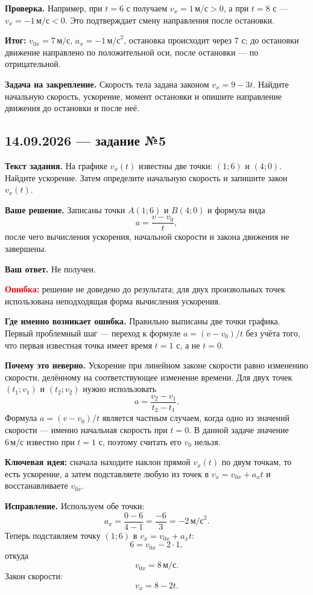 \documentclass[12pt,a4paper]{article}
\newcommand{\taskhead}[1]{\subsection*{#1}}
\newcommand{\field}[1]{\textbf{#1}}
\begin{document}
\field{Проверка.} Например, при $t=6$ с получаем $v_x=1\,\text{м/с}>0$, а при $t=8$ с --- $v_x=-1\,\text{м/с}<0$. Это подтверждает смену направления после остановки.

\textcolor{teal!60!black}{\textbf{Итог:}} $v_{0x}=7\,\text{м/с}$, $a_x=-1\,\text{м/с}^2$, остановка происходит через $7$ с; до остановки движение направлено по положительной оси, после остановки --- по отрицательной.

\field{Задача на закрепление.} Скорость тела задана законом $v_x=9-3t$. Найдите начальную скорость, ускорение, момент остановки и опишите направление движения до остановки и после неё.

\newpage
{}\label{task:14-5}
\taskhead{14.09.2026 --- задание №5}

\field{Текст задания.} На графике $v_x(t)$ известны две точки: $(1;6)$ и $(4;0)$. Найдите ускорение. Затем определите начальную скорость и запишите закон $v_x(t)$.

\field{Ваше решение.} Записаны точки $A(1;6)$ и $B(4;0)$ и формула вида
\[
a=\frac{v-v_0}{t},
\]
после чего вычисления ускорения, начальной скорости и закона движения не завершены.

\field{Ваш ответ.} Не получен.

\textcolor{red}{\textbf{Ошибка:}} решение не доведено до результата; для двух произвольных точек использована неподходящая форма вычисления ускорения.

\field{Где именно возникает ошибка.} Правильно выписаны две точки графика. Первый проблемный шаг --- переход к формуле $a=(v-v_0)/t$ без учёта того, что первая известная точка имеет время $t=1$ с, а не $t=0$.

\field{Почему это неверно.} Ускорение при линейном законе скорости равно изменению скорости, делённому на соответствующее изменение времени. Для двух точек $(t_1;v_1)$ и $(t_2;v_2)$ нужно использовать
\[
a=\frac{v_2-v_1}{t_2-t_1}.
\]
Формула $a=(v-v_0)/t$ является частным случаем, когда одно из значений скорости --- именно начальная скорость при $t=0$. В данной задаче значение $6\,\text{м/с}$ известно при $t=1$ с, поэтому считать его $v_0$ нельзя.

\textcolor{blue!60!black}{\textbf{Ключевая идея:}} сначала находите наклон прямой $v_x(t)$ по двум точкам, то есть ускорение, а затем подставляете любую из точек в $v_x=v_{0x}+a_xt$ и восстанавливаете $v_{0x}$.

\field{Исправление.} Используем обе точки:
\[
a_x=\frac{0-6}{4-1}=\frac{-6}{3}=-2\,\text{м/с}^2.
\]
Теперь подставляем точку $(1;6)$ в $v_x=v_{0x}+a_xt$:
\[
6=v_{0x}-2\cdot1,
\]
откуда
\[
v_{0x}=8\,\text{м/с}.
\]
Закон скорости:
\[
v_x=8-2t.
\]
\end{document}
